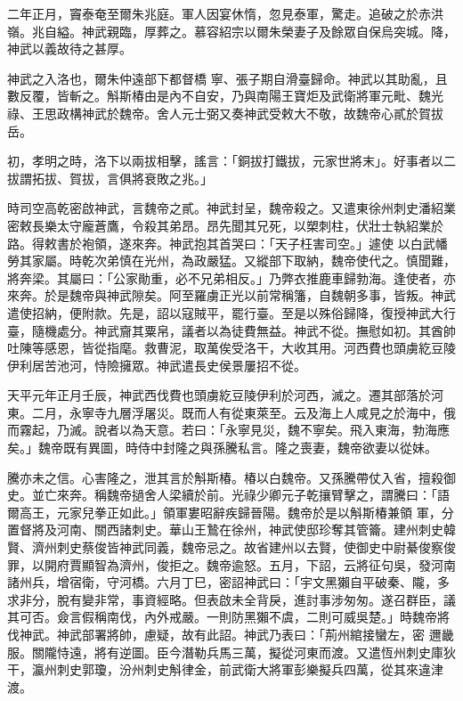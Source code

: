 \begin{pinyinscope}
 二年正月，竇泰奄至爾朱兆庭。軍人因宴休惰，忽見泰軍，驚走。追破之於赤洪嶺。兆自縊。神武親臨，厚葬之。慕容紹宗以爾朱榮妻子及餘眾自保烏突城。降，神武以義故待之甚厚。



 神武之入洛也，爾朱仲遠部下都督橋
 寧、張子期自滑臺歸命。神武以其助亂，且數反覆，皆斬之。斛斯椿由是內不自安，乃與南陽王寶炬及武衛將軍元毗、魏光祿、王思政構神武於魏帝。舍人元士弼又奏神武受敕大不敬，故魏帝心貳於賀拔岳。



 初，孝明之時，洛下以兩拔相擊，謠言：「銅拔打鐵拔，元家世將末」。好事者以二拔謂拓拔、賀拔，言俱將衰敗之兆。」



 時司空高乾密啟神武，言魏帝之貳。神武封呈，魏帝殺之。又遣東徐州刺史潘紹業密敕長樂太守龐蒼鷹，令殺其弟昂。昂先聞其兄死，以槊刺柱，伏壯士執紹業於路。得敕書於袍領，遂來奔。神武抱其首哭曰：「天子枉害司空。」遽使
 以白武幡勞其家屬。時乾次弟慎在光州，為政嚴猛。又縱部下取納，魏帝使代之。慎聞難，將奔梁。其屬曰：「公家勛重，必不兄弟相反。」乃弊衣推鹿車歸勃海。逢使者，亦來奔。於是魏帝與神武隙矣。阿至羅虜正光以前常稱籓，自魏朝多事，皆叛。神武遣使招納，便附款。先是，詔以寇賊平，罷行臺。至是以殊俗歸降，復授神武大行臺，隨機處分。神武齎其粟帛，議者以為徒費無益。神武不從。撫慰如初。其酋帥吐陳等感恩，皆從指麾。救曹泥，取萬俟受洛干，大收其用。河西費也頭虜紇豆陵伊利居苦池河，恃險擁眾。神武遣長史侯景屢招不從。



 天平元年正月壬辰，神武西伐費也頭虜紇豆陵伊利於河西，滅之。遷其部落於河東。二月，永寧寺九層浮屠災。既而人有從東萊至。云及海上人咸見之於海中，俄而霧起，乃滅。說者以為天意。若曰：「永寧見災，魏不寧矣。飛入東海，勃海應矣。」魏帝既有異圖，時侍中封隆之與孫騰私言。隆之喪妻，魏帝欲妻以從妹。



 騰亦未之信。心害隆之，泄其言於斛斯椿。椿以白魏帝。又孫騰帶仗入省，擅殺御史。並亡來奔。稱魏帝撾舍人梁續於前。光祿少卿元子乾攘臂擊之，謂騰曰：「語爾高王，元家兒拳正如此。」領軍婁昭辭疾歸晉陽。魏帝於是以斛斯椿兼領
 軍，分置督將及河南、關西諸刺史。華山王鷙在徐州，神武使邸珍奪其管籥。建州刺史韓賢、濟州刺史蔡俊皆神武同義，魏帝忌之。故省建州以去賢，使御史中尉綦俊察俊罪，以開府賈顯智為濟州，俊拒之。魏帝逾怒。五月，下詔，云將征句吳，發河南諸州兵，增宿衛，守河橋。六月丁巳，密詔神武曰：「宇文黑獺自平破秦、隴，多求非分，脫有變非常，事資經略。但表啟未全背戾，進討事涉匆匆。遂召群臣，議其可否。僉言假稱南伐，內外戒嚴。一則防黑獺不虞，二則可威吳楚。」時魏帝將伐神武。神武部署將帥，慮疑，故有此詔。神武乃表曰：「荊州綰接蠻左，密
 邇畿服。關隴恃遠，將有逆圖。臣今潛勒兵馬三萬，擬從河東而渡。又遣恆州刺史庫狄干，瀛州刺史郭瓊，汾州刺史斛律金，前武衛大將軍彭樂擬兵四萬，從其來違津渡。




\end{pinyinscope}
